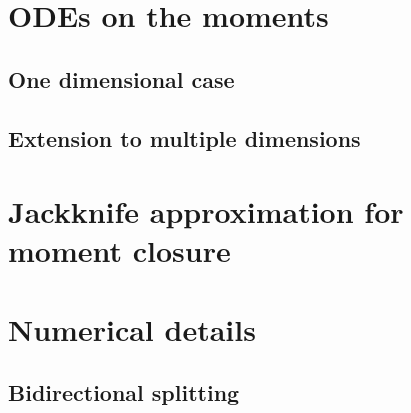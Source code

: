 \appendix
\section{ODEs on the moments} \label{calc}
\subsection{One dimensional case}
\subsection{Extension to multiple dimensions}\label{multidimcalc}



\section{Jackknife approximation for moment closure}

\section{Numerical details}
\subsection{Bidirectional splitting}

 

